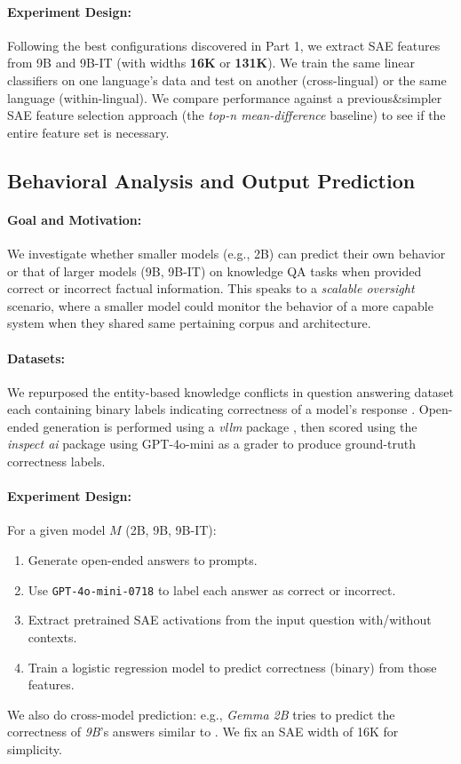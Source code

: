 \paragraph{Experiment Design:}
Following the best configurations discovered in Part 1, we extract SAE features from 9B and 9B-IT (with widths \textbf{16K} or \textbf{131K}). We train the same linear classifiers on one language’s data and test on another (cross-lingual) or the same language (within-lingual). We compare performance against a previous\&simpler SAE feature selection approach (the \emph{top-n mean-difference} baseline) to see if the entire feature set is necessary.

\subsection{Behavioral Analysis and Output Prediction}
\label{sec:part3}

\paragraph{Goal and Motivation:}
We investigate whether smaller models (e.g., 2B) can predict their own behavior or that of larger models (9B, 9B-IT) on knowledge QA tasks when provided correct or incorrect factual information. This speaks to a \emph{scalable oversight} scenario, where a smaller model could monitor the behavior of a more capable system when they shared same pertaining corpus and architecture.

\paragraph{Datasets:}
We repurposed the entity-based knowledge conflicts in question answering dataset each containing binary labels indicating correctness of a model’s response \cite{longpre2022entitybasedknowledgeconflictsquestion}. Open-ended generation is performed using a \emph{vllm} package \cite{kwon2023efficient}, then scored using the \emph{inspect ai} package \cite{UKGovernmentBEIS_inspect_ai} using GPT-4o-mini as a grader to produce ground-truth correctness labels.

\paragraph{Experiment Design:}
For a given model $M$ (2B, 9B, 9B-IT):
\begin{enumerate}
    \item Generate open-ended answers to prompts.
    \item Use \texttt{GPT-4o-mini-0718} to label each answer as correct or incorrect.
    \item Extract pretrained SAE activations from the input question with/without contexts.
    \item Train a logistic regression model to predict correctness (binary) from those features.
\end{enumerate}
We also do cross-model prediction: e.g., \emph{Gemma 2B} tries to predict the correctness of \emph{9B}’s answers similar to \cite{binder2024lookinginwardlanguagemodels}. We fix an SAE width of 16K for simplicity.


